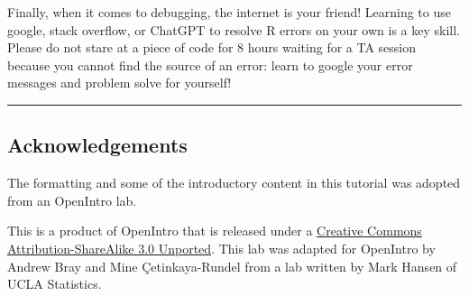\documentclass[
]{article}
\begin{document}
Finally, when it comes to debugging, the internet is your friend!
Learning to use google, stack overflow, or ChatGPT to resolve R errors
on your own is a key skill. Please do not stare at a piece of code for 8
hours waiting for a TA session because you cannot find the source of an
error: learn to google your error messages and problem solve for
yourself!

\begin{center}\rule{0.5\linewidth}{0.5pt}\end{center}

\subsection{Acknowledgements}\label{acknowledgements}

The formatting and some of the introductory content in this tutorial was
adopted from an OpenIntro lab.

\label{license}
This is a product of OpenIntro that is released under a
\href{http://creativecommons.org/licenses/by-sa/3.0}{Creative Commons
Attribution-ShareAlike 3.0 Unported}. This lab was adapted for OpenIntro
by Andrew Bray and Mine Çetinkaya-Rundel from a lab written by Mark
Hansen of UCLA Statistics.
\end{document}
